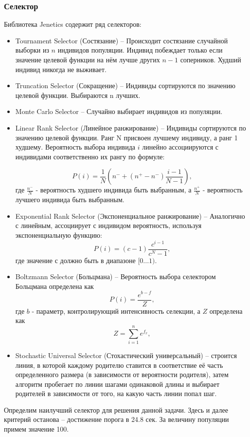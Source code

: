 		\subsubsection{Селектор}
			Библиотека Jenetics содержит ряд селекторов:
			\begin{itemize}
				\item Tournament Selector (Состязание) -- Происходит состязание случайной выборки из $ n $ индивидов популяции. Индивид побеждает только если значение целевой функции на нём лучше других $n-1$ соперников. Худший индивид никогда не выживает. 

				\item Truncation Selector (Сокращение) -- Индивиды сортируются по значению целевой функции. Выбираются n лучших.
				\item Monte Carlo Selector -- Случайно выбирает индивидов из популяции.
				\item Linear Rank Selector (Линейное ранжирование) -- Индивиды сортируются по значению целевой функции. Ранг N присвоен лучшему индивиду, а ранг 1 худшему. Вероятность выбора индивида $ i $ линейно ассоциируются с индивидами соответственно их рангу по формуле:
				
				\[P(i) = \dfrac{1}{N}(n^-+(n^+-n^-)\dfrac{i-1}{N-1}),\]
				где $ \frac{n^-}{N} $ - вероятность худшего индивида быть выбранным, а $ \frac{n^+}{N} $ - вероятность лучшего индивида быть выбранным.
				\item Exponential Rank Selector (Экспоненциальное ранжирование) -- Аналогично с линейным, ассоциирует с индивидом вероятность, используя экспоненциальную функцию:
				\[P(i)=(c-1)\dfrac{c^{i-1}}{c^N-1},\]
				где значение $ с $ должно быть в диапазоне $[0...1)$.
				\item Boltzmann Selector (Больцмана) -- Вероятность выбора селектором Больцмана определена как
				\[P(i)=\dfrac{e^{b-f}}{Z},\]
				где $ b $ - параметр, контролирующий интенсивность селекции, а $ Z $ определена как
				\[Z=\sum_{i=1}^{n}e^{f_x},\] 
				\item Stochastic Universal Selector (Стохастический универсальный) – строится линия, в которой каждому родителю ставится в соответствие её часть определенного размера (в зависимости от вероятности родителя), затем алгоритм пробегает по линии шагами одинаковой длины и выбирает родителей в зависимости от того, на какую часть линии попал шаг.
			\end{itemize}
		
		
			Определим наилучший селектор для решения данной задачи. Здесь и далее критерий останова -- достижение порога в 24.8 сек. За величину популяции примем значение 100.
			
